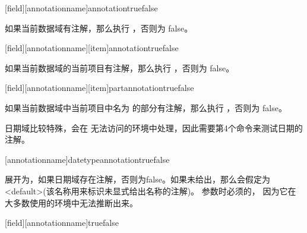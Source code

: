 \begin{ltxsyntax}


[field][annotationname]{annotation}{true}{false}


如果当前数据域有注解，那么执行 ，否则为 false。

[field][annotationname][item]{annotation}{true}{false}


如果当前数据域的当前项目有注解，那么执行 ，否则为 false。


[field][annotationname][item]{part}{annotation}{true}{false}


如果当前数据域中当前项目中名为  的部分有注解，那么执行 ，否则为 false。


日期域比较特殊，会在 无法访问的环境中处理，因此需要第4个命令来测试日期的注解。

[annotationname]{datetype}{annotation}{true}{false}


展开为，如果日期域存在注解，否则为false。如果未给出，那么会假定为<default>(该名称用来标识未显式给出名称的注解)。 参数时必须的，
因为它在大多数使用的环境中无法推断出来。

[field][annotationname]{true}{false}


\end{ltxsyntax}
